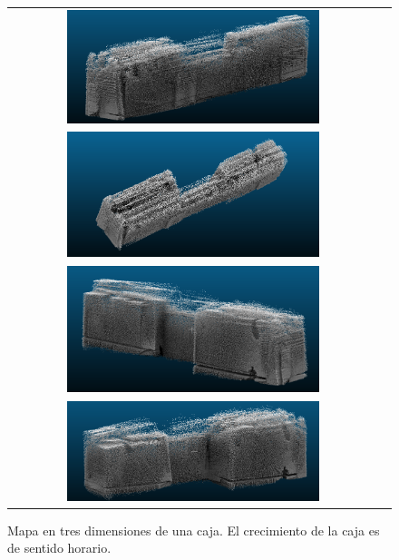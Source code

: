 \begin{figure}%
    \centering
    \begin{tabular}{cc}
      \includegraphics[width=0.70\textwidth]{images/3DSotano1.png}\\
      \includegraphics[width=0.70\textwidth]{images/3DSotano2.png}\\
      \includegraphics[width=0.70\textwidth]{images/3DSotano3.png}\\
      \includegraphics[width=0.70\textwidth]{images/3DSotano4.png}\\
    \end{tabular}
  \captionsetup{font=footnotesize}
    \caption{\label{fig:tunel2013D}Mapa en tres dimensiones de una caja. El 
    crecimiento de la caja es de sentido horario.}
\end{figure} 




